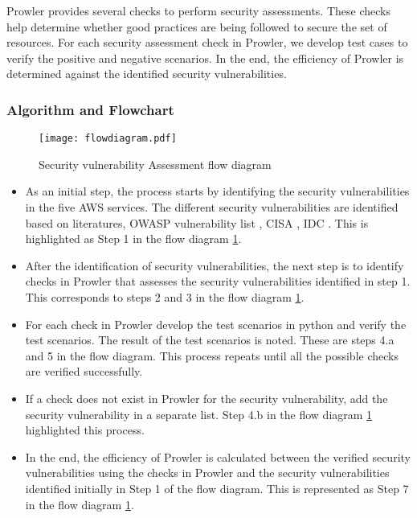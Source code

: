 \par Prowler provides several checks to perform security assessments.
These checks help determine whether good practices are being followed to secure the set of resources. For each security assessment check in Prowler, we develop test cases to verify the positive and negative scenarios. In the end, the efficiency of Prowler is determined against the identified security vulnerabilities.

\subsubsection{Algorithm and Flowchart}

\begin{figure}
    \centering
    \texttt{[image: flowdiagram.pdf]}
    \caption{Security vulnerability Assessment flow diagram}
    \label{fig:flowdiagram}
\end{figure}
\begin{itemize}
    \item As an initial step, the process starts by identifying the security vulnerabilities in the five AWS services.
    The different security vulnerabilities are identified
    based on literatures, OWASP vulnerability list
    \cite{51}, CISA \cite{52}, IDC \cite{53}.
    This is highlighted as Step 1 in the flow diagram \ref{fig:flowdiagram}.
\end{itemize}
\begin{itemize}
    \item After the identification of security vulnerabilities, the next step is to identify checks in Prowler that assesses the security vulnerabilities identified in step 1.
    This corresponds to steps 2 and 3 in the flow diagram \ref{fig:flowdiagram}.
\end{itemize}
\begin{itemize}
    \item For each check in Prowler develop the test scenarios in python and verify the test scenarios. The result of the test scenarios is noted. These are steps 4.a and 5 in the flow diagram. This process repeats until all the possible checks are verified successfully.
\end{itemize}
\begin{itemize}
    \item If a check does not exist in Prowler for the security vulnerability, add the security vulnerability in a separate list.
    Step 4.b in the flow diagram \ref{fig:flowdiagram} highlighted this process.
\end{itemize}
\begin{itemize}
    \item In the end, the efficiency of Prowler is calculated between the verified security vulnerabilities using the checks in Prowler and the security vulnerabilities identified initially in Step 1 of the flow diagram.
    This is represented as Step 7 in the flow diagram \ref{fig:flowdiagram}.
\end{itemize}


